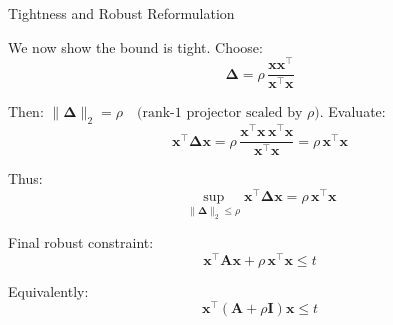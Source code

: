 \documentclass{beamer}
\begin{document}
\begin{frame}{Tightness and Robust Reformulation}
	\begin{flushleft}
		
		We now show the bound is tight. Choose:
		\[
		\mathbf{\Delta} = \rho \, \frac{\mathbf{x}\mathbf{x}^\top}{\mathbf{x}^\top \mathbf{x}}
		\]
		
		Then: $		\|\mathbf{\Delta}\|_2 = \rho
		\quad \text{(rank-1 projector scaled by } \rho \text{)}$. Evaluate:
		\[
		\mathbf{x}^\top \mathbf{\Delta} \mathbf{x}
		= \rho \, \frac{\mathbf{x}^\top \mathbf{x} \, \mathbf{x}^\top \mathbf{x}}{\mathbf{x}^\top \mathbf{x}}
		= \rho \, \mathbf{x}^\top \mathbf{x}
		\]
		
		
		Thus:
		\[
		\sup_{\|\mathbf{\Delta}\|_2 \le \rho} \mathbf{x}^\top \mathbf{\Delta} \mathbf{x} = \rho \, \mathbf{x}^\top \mathbf{x
		}
		\]
		
		
		Final robust constraint:
		\[
		\mathbf{x}^\top \mathbf{A} \mathbf{x} + \rho \, \mathbf{x}^\top \mathbf{x} \le t
		\]
		
		
		Equivalently:
		\[
		\mathbf{x}^\top (\mathbf{A} + \rho \mathbf{I})\mathbf{x} \le t
		\]
		
	\end{flushleft}
\end{frame}



\myqrframe
\end{document}
